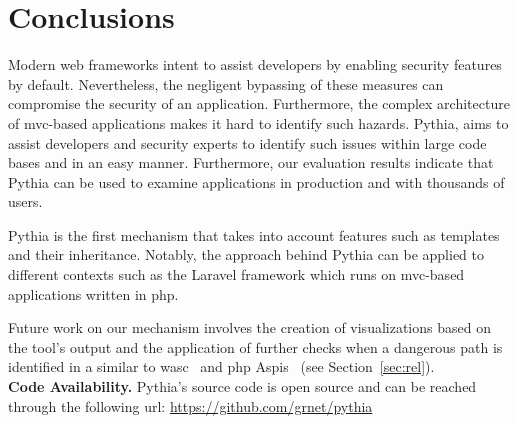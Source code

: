 \section{Conclusions}
\label{sec:conc}

Modern web frameworks intent to
assist developers by enabling
security features by default.
Nevertheless,
the negligent bypassing of these
measures can compromise 
the security of an application.
Furthermore,
the complex architecture of
{\sc mvc}-based applications
makes it hard to identify such hazards.
Pythia,
aims to assist developers and
security experts to identify
such issues within large code bases
and in an easy manner.
Furthermore,
our evaluation results indicate
that Pythia can be used to examine
applications in production and with
thousands of users.

Pythia is the first mechanism
that takes into account features
such as templates and their inheritance.
Notably,
the approach behind Pythia can be
applied to different contexts
such as the Laravel framework which
runs on {\sc mvc}-based applications
written in {\sc php}.

Future work on our mechanism
involves the creation of visualizations
based on the tool's output and the
application of further checks
when a dangerous path is identified
in a similar to
{\sc wasc}~\cite{NLC07} and
{\sc php} Aspis~\cite{PMP11}
(see Section~\ref{sec:rel}).\\

\noindent
{\bf Code Availability.}
Pythia's source code is open source and
can be reached through the
following {\sc url}:
\url{https://github.com/grnet/pythia}

